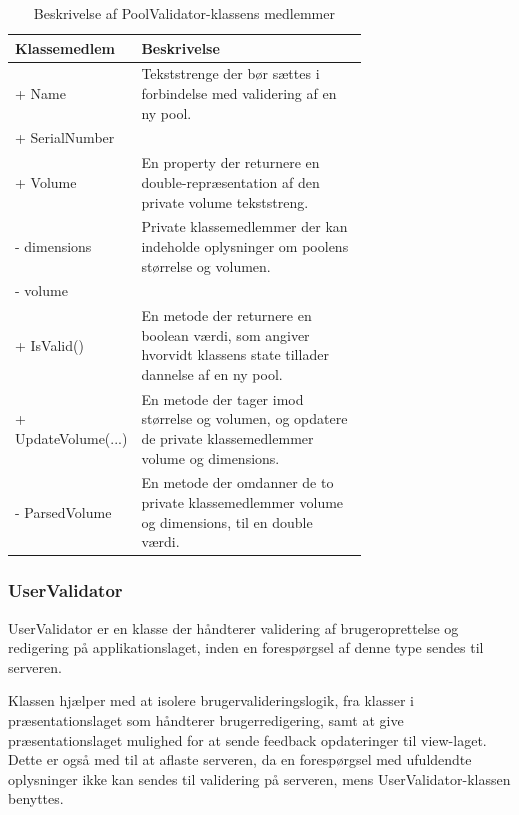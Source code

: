 \begin{table}
	\centering
	\begin{tabular}{| l | p{0.7\linewidth} |}
		\toprule
		\textbf{Klassemedlem}	& \textbf{Beskrivelse} \\
		\midrule
		+ Name				& Tekststrenge der bør sættes i forbindelse med validering af en ny pool.	\\
		+ SerialNumber			& 	\\\hline
		+ Volume 				& En property der returnere en double-repræsentation af den private volume tekststreng. \\\hline
		- dimensions 			& Private klassemedlemmer der kan indeholde oplysninger om poolens størrelse og volumen. \\
		- volume 				& 	\\\hline
		+ IsValid()					& En metode der returnere en boolean værdi, som angiver hvorvidt klassens state tillader dannelse af en ny pool. \\\hline
		+ UpdateVolume(...)						& En metode der tager imod størrelse og volumen, og opdatere de private klassemedlemmer volume og dimensions. \\\hline
		- ParsedVolume					& En metode der omdanner de to private klassemedlemmer volume og dimensions, til en double værdi. \\
		\bottomrule
		\end{tabular}
	\caption{Beskrivelse af PoolValidator-klassens medlemmer}
	\label{tab:table_design_poolvalidator}	
\end{table}

\subsubsection{UserValidator}
UserValidator er en klasse der håndterer validering af brugeroprettelse og redigering på applikationslaget, inden en forespørgsel af denne type sendes til serveren.

Klassen hjælper med at isolere brugervalideringslogik, fra klasser i præsentationslaget som håndterer brugerredigering, samt at give præsentationslaget mulighed for at sende feedback opdateringer til view-laget. Dette er også med til at aflaste serveren, da en forespørgsel med ufuldendte oplysninger ikke kan sendes til validering på serveren, mens UserValidator-klassen benyttes.

